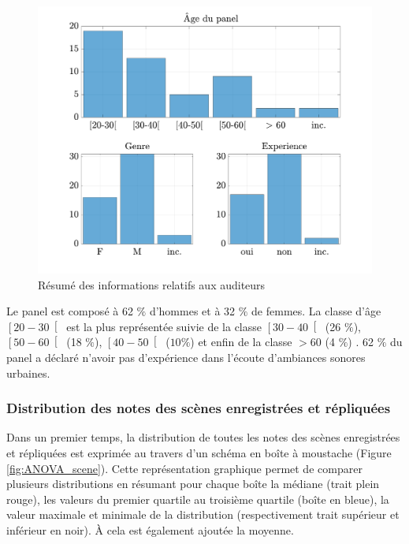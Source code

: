 \begin{figure}[ht]
\centering
\includegraphics[width = .8\textwidth]{./figures/test_perceptif/testPerceptif_panel.pdf}
\caption{Résumé des informations relatifs aux auditeurs}
\label{fig:panelTest}
\end{figure}

Le panel est composé à 62 $\%$ d'hommes et à 32 $\%$ de femmes. La classe d'âge $\left[20-30\right[$ est la plus représentée suivie de la classe $\left[30-40\right[$ (26 $\%$), $\left[50-60\right[$ (18 $\%$), $\left[40-50\right[$ ($10\%$) et enfin de la classe $>60$ (4 $\%$) . 62 $\%$ du panel a déclaré n'avoir pas d'expérience dans l'écoute d'ambiances sonores urbaines.\\

\subsubsection{Distribution des notes des scènes enregistrées et répliquées} 

Dans un premier temps, la distribution de toutes les notes des scènes enregistrées et répliquées est exprimée au travers d'un schéma en boîte à moustache (Figure \ref{fig:ANOVA_scene}). Cette représentation graphique permet de comparer plusieurs distributions en résumant pour chaque boîte la médiane (trait plein rouge), les valeurs du  premier quartile au troisième quartile (boîte en bleue), la valeur maximale et minimale de la distribution (respectivement trait supérieur et inférieur en noir). \`A cela est également ajoutée la moyenne.\\

